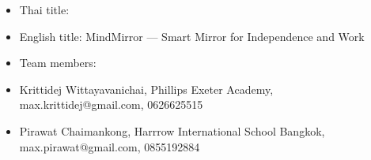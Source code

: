   \item {}
    \begin{itemize}
      \item Thai title: 
      \item English title: MindMirror --- Smart Mirror for Independence and Work
    \end{itemize}

  \item {}
    \begin{itemize}
      \item Team members:
      \item Krittidej Wittayavanichai, Phillips Exeter Academy, max.krittidej@gmail.com, 0626625515
      \item Pirawat Chaimankong, Harrrow International School Bangkok, max.pirawat@gmail.com, 0855192884
    \end{itemize}
